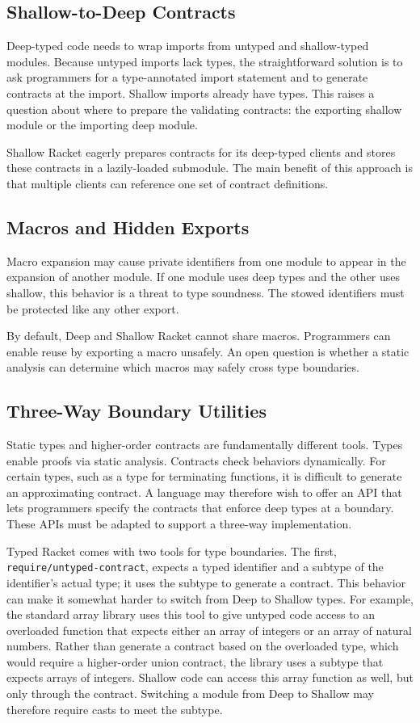 \documentclass[screen=true, natbib=false, 10pt, sigplan]{acmart}
\newcommand{\Scribtexttt}[1]{{\texttt{#1}}}
\let\SOriginalthesubsubsection\thesubsubsection
\newcommand{\Ssubsection}[2]{\subsection[#1]{#2}\let\thesubsubsection\SOriginalthesubsubsection}
\begin{document}
\Ssubsection{Shallow{-}to{-}Deep Contracts}{Shallow{-}to{-}Deep Contracts}\label{t:x28part_x22secx3aimplementationx3actcx2dgenx22x29}

Deep{-}typed code needs to wrap imports from untyped and
shallow{-}typed modules.
Because untyped imports lack types, the straightforward solution
is to ask programmers for a type{-}annotated import statement and
to generate contracts at the import.
Shallow imports already have types.
This raises a question about where to prepare the validating contracts:
the exporting shallow module or the importing deep module.

Shallow Racket eagerly prepares contracts for its deep{-}typed clients
and stores these contracts in a lazily{-}loaded submodule.
The main benefit of this approach is that multiple clients can reference one
set of contract definitions.

\Ssubsection{Macros and Hidden Exports}{Macros and Hidden Exports}\label{t:x28part_x22secx3aimplementationx3amacrox22x29}

Macro expansion may cause private identifiers from one
module to appear in the expansion of another module.
If one module uses deep types and the other uses shallow,
this behavior is a threat to type soundness.
The stowed identifiers must be protected like any other export.

By default, Deep and Shallow Racket cannot share macros.
Programmers can enable reuse by exporting a macro unsafely.
An open question is whether a static analysis can determine
which macros may safely cross type boundaries.

\Ssubsection{Three{-}Way Boundary Utilities}{Three{-}Way Boundary Utilities}\label{t:x28part_x22secx3aimplementationx3aapix22x29}

Static types and higher{-}order contracts are fundamentally different
tools.
Types enable proofs via static analysis.
Contracts check behaviors dynamically.
For certain types, such as a type for terminating functions,
it is difficult to generate an approximating contract.
A language may therefore wish to offer an API that lets programmers specify the
contracts that enforce deep types at a boundary.
These APIs must be adapted to support a three{-}way implementation.

Typed Racket comes with two tools for type boundaries.
The first, \Scribtexttt{require/untyped{-}contract}, expects a typed identifier and a subtype
of the identifier{'}s actual type; it uses the subtype to generate a contract.
This behavior can make it somewhat harder to switch from Deep to Shallow types.
For example, the standard array library
uses this tool to give untyped code access to an overloaded function that
expects either an array of integers or an array of natural numbers.
Rather than generate a contract based on the overloaded type, which would
require a higher{-}order union contract, the library uses a subtype that
expects arrays of integers.
Shallow code can access this array function as well, but only through the contract.
Switching a module from Deep to Shallow may therefore require
casts to meet the subtype.
\end{document}
